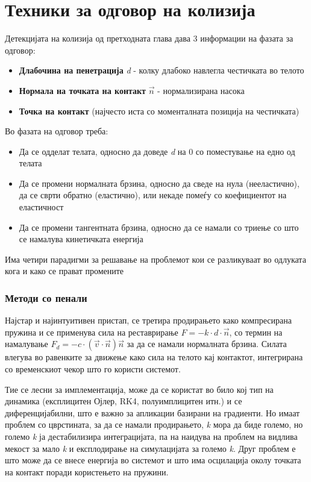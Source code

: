 \newpage
\chapter{Техники за одговор на колизија}

Детекцијата на колизија од претходната глава дава 3 информации на фазата за одговор:
\begin{itemize}
	\item \textbf{Длабочина на пенетрација} \textit{d} - колку длабоко навлегла честичката во телото
	\item \textbf{Нормала на точката на контакт} $\vec{n}$ - нормализирана насока
	\item \textbf{Точка на контакт} (најчесто иста со моменталната позиција на честичката)
\end{itemize}

Во фазата на одговор треба:
\begin{itemize}
	\item Да се одделат телата, односно да доведе \textit{d} на 0 со поместување на едно од телата
	\item Да се промени нормалната брзина, односно да сведе на нула (нееластично), да се сврти обратно (еластично), или некаде помеѓу со коефициентот на еластичност
	\item Да се промени тангентната брзина, односно да се намали со триење со што се намалува кинетичката енергија
\end{itemize}

Има четири парадигми за решавање на проблемот кои се разликуваат во одлуката кога и како се прават промените

\subsection{Методи со пенали}
Најстар и најинтуитивен пристап\cite{hahn1988realistic}, се третира продирањето како компресирана пружина и се применува сила на реставрирање $F = -k \cdot d \cdot \vec{n}$, со термин на намалување $F_d = -c \cdot(\vec{v} \cdot \vec{n})\vec{n}$ за да се намали нормалната брзина. Силата влегува во равенките за движење како сила на телото кај контактот, интегрирана со временскиот чекор што го користи системот.

Тие се лесни за имплементација, може да се користат во било кој тип на динамика (експлицитен Ојлер, RK4, полуимплицитен итн.) и се диференцијабилни, што е важно за апликации базирани на градиенти. Но имаат проблем со цврстината, за да се намали продирањето, \textit{k} мора да биде големо, но големо \textit{k} ја дестабилизира интеграцијата, па на наидува на проблем на видлива мекост за мало \textit{k} и експлодирање на симулацијата за големо \textit{k}. Друг проблем е што може да се внесе енергија во системот и што има осцилација околу точката на контакт поради користењето на пружини.

